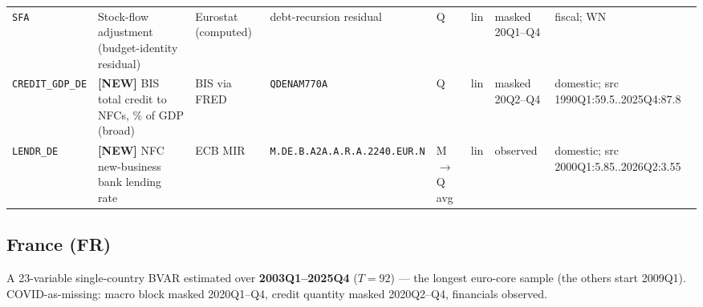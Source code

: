 \begin{longtable}{@{}p{}p{}p{}p{}p{}p{}p{}p{}@{}}
\texttt{SFA}        & Stock-flow adjustment (budget-identity residual) & Eurostat (computed) & debt-recursion residual & Q & lin & masked 20Q1--Q4 & fiscal; WN \\
\texttt{CREDIT\_GDP\_DE} & \textbf{[NEW]} BIS total credit to NFCs, \% of GDP (broad) & BIS via FRED & \texttt{QDENAM770A} & Q & lin & masked 20Q2--Q4 & domestic; src 1990Q1:59.5..\allowbreak 2025Q4:87.8 \\
\texttt{LENDR\_DE}  & \textbf{[NEW]} NFC new-business bank lending rate & ECB MIR & \texttt{M.\allowbreak DE.\allowbreak B.\allowbreak A2A.\allowbreak A.\allowbreak R.\allowbreak A.2240.\allowbreak EUR.\allowbreak N} & M$\to$Q avg & lin & observed & domestic; src 2000Q1:5.85..\allowbreak 2026Q2:3.55 \\
\end{longtable}

\subsection{France (FR)}
\label{sec:data:FR}

A 23-variable single-country BVAR estimated over \textbf{2003Q1--2025Q4}
($T=92$) --- the longest euro-core sample (the others start 2009Q1).
COVID-as-missing: macro block masked 2020Q1--Q4, credit quantity masked
2020Q2--Q4, financials observed.

